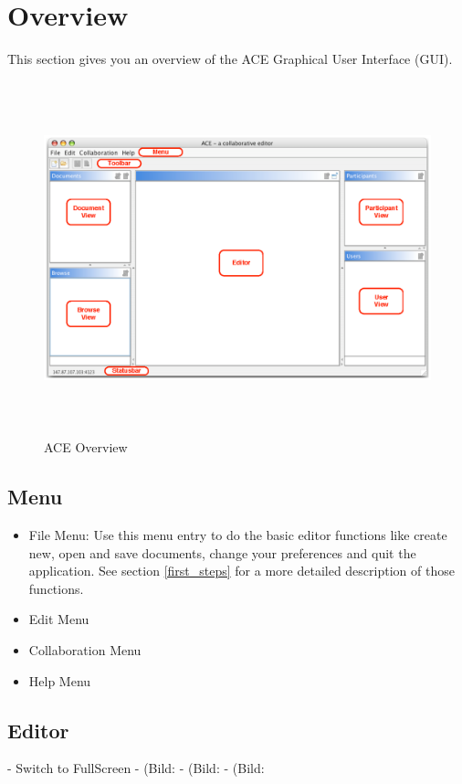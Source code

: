\documentclass[11pt,a4paper]{article}
\begin{document}
\newpage
\section{Overview}
This section gives you an overview of the ACE Graphical User Interface (GUI). 

\begin{figure}[H]
\begin{center}
  \includegraphics[height=4.03in, width=6.19in]{../images/usermanual/ace_overview.eps}
\caption{ACE Overview}
\label{default}
\end{center}
\end{figure}

\subsection{Menu}
\begin{itemize}
\item File Menu: Use this menu entry to do the basic editor functions like create new, open and save documents, change your preferences and quit the application. See section \ref{first_steps} for a more detailed description of those functions.
\item Edit Menu
\item Collaboration Menu
\item Help Menu
\end{itemize}

\subsection{Editor}
- Switch to FullScreen
- (Bild: %
- (Bild: %
- (Bild: %
\end{document}
